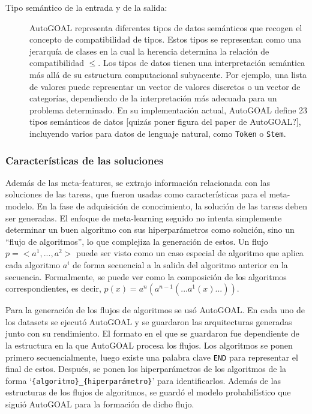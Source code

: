\begin{itemize}
\begin{description}
		\item[Tipo semántico de la entrada y de la salida:] AutoGOAL representa diferentes tipos de datos semánticos que recogen el concepto de compatibilidad de tipos. Estos tipos se representan como una jerarquía de clases en la cual la herencia determina la relación de compatibilidad $\leq$. Los tipos de datos tienen una interpretación semántica más allá de su estructura computacional subyacente. Por ejemplo, una lista de valores puede representar un vector de valores discretos o un vector de categorías, dependiendo de la interpretación más adecuada para un problema determinado. En su implementación actual, AutoGOAL define 23 tipos semánticos de datos [quizás poner figura del paper de AutoGOAL?], incluyendo varios para datos de lenguaje natural, como \texttt{Token} o \texttt{Stem}.
	\end{description}
\end{itemize}

\subsubsection{Características de las soluciones}

Además de las meta-features, se extrajo información relacionada con las soluciones de las tareas, que fueron usadas como características para el meta-modelo. En la fase de adquisición de conocimiento, la solución de las tareas deben ser generadas. El enfoque de meta-learning seguido no intenta simplemente determinar un buen algoritmo con sus hiperparámetros como solución, sino un ``flujo de algoritmos'', lo que complejiza la generación de estos. Un flujo $p = <a^1, ..., a^2>$  puede ser visto como un caso especial de algoritmo que aplica cada algoritmo $a^i$ de forma secuencial a la salida del algoritmo anterior en la secuencia. Formalmente, se puede ver como la composición de los algoritmos correspondientes, es decir, $p(x) = a^n(a^{n-1}(...a^1(x)...))$.

Para la generación de los flujos de algoritmos se usó AutoGOAL. En cada uno de los datasets se ejecutó AutoGOAL y se guardaron las arquitecturas generadas junto con su rendimiento. El formato en el que se guardaron fue dependiente de la estructura en la que AutoGOAL procesa los flujos. Los algoritmos se ponen primero secuencialmente, luego existe una palabra clave \texttt{END} para representar el final de estos. Después, se ponen los hiperparámetros de los algoritmos de la forma  `\texttt{\{algoritmo\}\_\{hiperparámetro\}}' para identificarlos. Además de las estructuras de los flujos de algoritmos, se guardó el modelo probabilístico que siguió AutoGOAL para la formación de dicho flujo.

